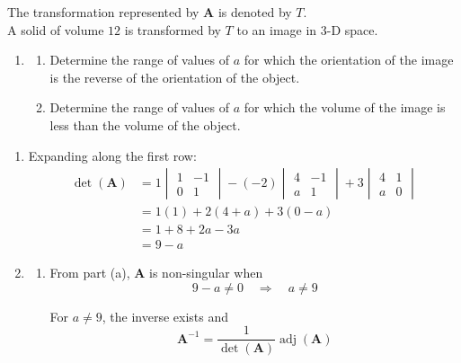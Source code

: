\documentclass[leqno]{article}
\begin{document}
\begin{enumerate}[
  label=\textbf{\arabic*.},
  leftmargin=*,
  topsep=0pt,
  partopsep=0pt,
  parsep=0pt
]
The transformation represented by $\mathbf{A}$ is denoted by $T$. \\
A solid of volume $12$ is transformed by $T$ to an image in 3-D space. \\

\begin{enumerate}[label=\textbf{(\alph*)}, resume]
  \item
  \begin{enumerate}[label=(\roman*)]
    \item Determine the range of values of $a$ for which the orientation of the image is the reverse of the orientation of the object. 
    \item Determine the range of values of $a$ for which the volume of the image is less than the volume of the object.  \\
  \end{enumerate}
\end{enumerate}

\vspace*{10pt}

\begin{djsSolution}
\begin{enumerate}[label=\textbf{(\alph*)}]
  \item Expanding along the first row:
  \begin{align*}
  \det(\mathbf{A})
  &=1\begin{vmatrix}1&-1\\0&1\end{vmatrix}
  -(-2)\begin{vmatrix}4&-1\\ a&1\end{vmatrix}
  +3\begin{vmatrix}4&1\\ a&0\end{vmatrix} \\
  &=1(1)+2(4+a)+3(0-a) \\
  &=1+8+2a-3a \\
  &=9-a
  \end{align*}

  \item
  \begin{enumerate}[label=(\roman*)]
    \item From part (a), \(\mathbf{A}\) is non-singular when
    \[
    9-a\neq 0\quad\Longrightarrow\quad a\neq 9
    \]

    For \(a\neq 9\), the inverse exists and
    \[
    \mathbf{A}^{-1}=\frac{1}{\det(\mathbf{A})}\operatorname{adj}(\mathbf{A})
    \]


\end{enumerate}
\end{enumerate}
\end{djsSolution}
\end{enumerate}
\end{document}
